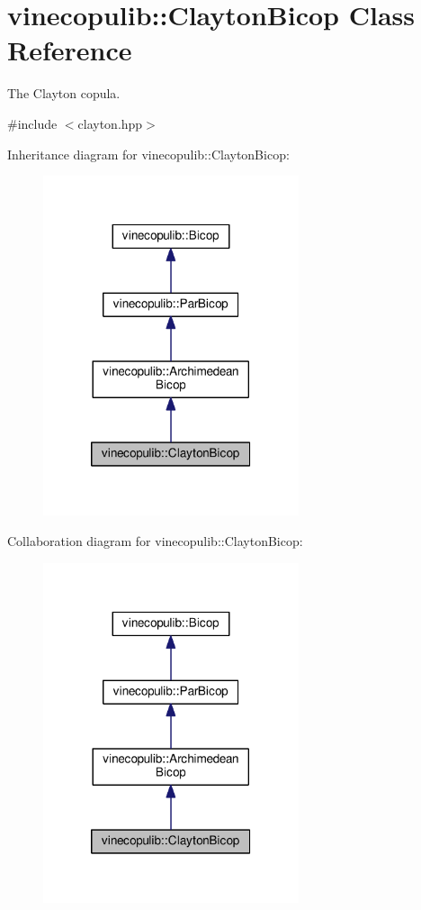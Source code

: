 \hypertarget{classvinecopulib_1_1_clayton_bicop}{}\section{vinecopulib\+:\+:Clayton\+Bicop Class Reference}
\label{classvinecopulib_1_1_clayton_bicop}


The Clayton copula.  




{\ttfamily \#include $<$clayton.\+hpp$>$}



Inheritance diagram for vinecopulib\+:\+:Clayton\+Bicop\+:\nopagebreak
\begin{figure}[H]
\begin{center}
\leavevmode
\includegraphics[width=213pt]{classvinecopulib_1_1_clayton_bicop__inherit__graph}
\end{center}
\end{figure}


Collaboration diagram for vinecopulib\+:\+:Clayton\+Bicop\+:\nopagebreak
\begin{figure}[H]
\begin{center}
\leavevmode
\includegraphics[width=213pt]{classvinecopulib_1_1_clayton_bicop__coll__graph}
\end{center}
\end{figure}
